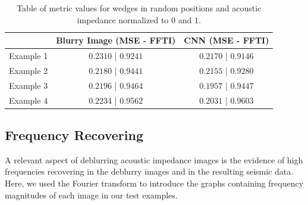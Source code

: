 \documentclass[conference]{IEEEtran}
\begin{document}
\begin{table}[!t]
\renewcommand{\arraystretch}{1.2}
\caption{Table of metric values for wedges in random positions and acoustic impedance normalized to $0$ and $1$.}
\label{table_caso_6}
\centering
\begin{tabular}{|c||c||c|}
\hline
  & Blurry Image (MSE - FFTI) & CNN (MSE - FFTI)\\
\hline
Example 1 & $0.2310$ | $0.9241$ & $0.2170$ | $0.9146$\\
\hline
Example 2 & $0.2180$ | $0.9441$ & $0.2155$ | $0.9280$\\
\hline
Example 3 & $0.2196$ | $0.9464$ & $0.1957$ | $0.9447$\\
\hline
Example 4 & $0.2234$ | $0.9562$ & $0.2031$ | $0.9603$\\
\hline
\end{tabular}
\end{table}

\subsection{Frequency Recovering}
A relevant aspect of deblurring acoustic impedance images is the
evidence of high frequencies recovering in the deblurry images and in
the resulting seismic data. Here, we used the Fourier transform
to introduce the graphs containing frequency magnitudes of each image in our
test examples.
\end{document}
